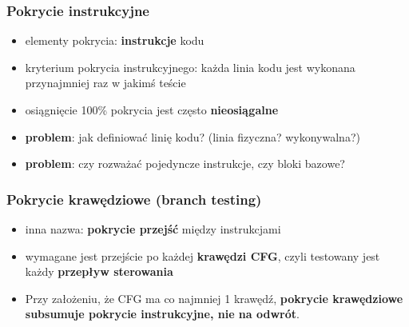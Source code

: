 \documentclass[../main.tex]{subfiles}
\begin{document}
    \subsubsection{Pokrycie instrukcyjne}
    \begin{itemize}
        \item elementy pokrycia: \textbf{instrukcje} kodu
        \item kryterium pokrycia instrukcyjnego: każda linia kodu jest wykonana
        przynajmniej raz w jakimś teście
        \item osiągnięcie 100\% pokrycia jest często \textbf{nieosiągalne}
        \item \textbf{problem}: jak definiować linię kodu? (linia fizyczna? wykonywalna?)
        \item \textbf{problem}: czy rozważać pojedyncze instrukcje, czy bloki bazowe?
    \end{itemize}

    \subsubsection{Pokrycie krawędziowe (branch testing)}
    \begin{itemize}
        \item inna nazwa: \textbf{pokrycie przejść} między instrukcjami
        \item wymagane jest przejście po każdej
        \textbf{krawędzi CFG}, czyli testowany jest każdy \textbf{przepływ sterowania}
        \item Przy założeniu, że CFG ma co najmniej 1 krawędź, \textbf{pokrycie
        krawędziowe subsumuje pokrycie instrukcyjne, nie na odwrót}.
    \end{itemize}
\end{document}
